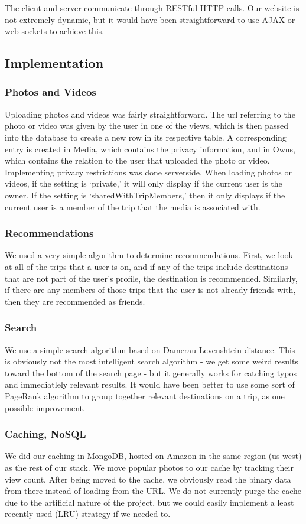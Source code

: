 \documentclass[11pt]{amsart}
\begin{document}
The client and server communicate through RESTful HTTP calls. Our website is not extremely dynamic,
but it would have been straightforward to use AJAX or web sockets to achieve this.

\subsection{Implementation}
\subsubsection{Photos and Videos}
Uploading photos and videos was fairly straightforward. The url referring to the photo or video was given by
the user in one of the views, which is then passed into the database to create a new row in its respective table.
A corresponding entry is created in Media, which contains the privacy information, and in Owns, which contains
the relation to the user that uploaded the photo or video.\\

Implementing privacy restrictions was done serverside. When loading photos or videos, if the setting is `private,'
it will only display if the current user is the owner. If the setting is `sharedWithTripMembers,' then it only displays
if the current user is a member of the trip that the media is associated with.
\subsubsection{Recommendations} We used a very simple algorithm to determine recommendations. First, we look at all of the
trips that a user is on, and if any of the trips include destinations that are not part of the user's profile, the destination
is recommended. Similarly, if there are any members of those trips that the user is not already friends with, then they are
recommended as friends.
\subsubsection{Search}
We use a simple search algorithm based on Damerau-Levenshtein distance. This is
obviously not the most intelligent search algorithm - we get some weird results
toward the bottom of the search page - but it generally works for catching typos
and immediatlely relevant results. It would have been better to use some sort of
PageRank algorithm to group together relevant destinations on a trip, as one
possible improvement.
\subsubsection{Caching, NoSQL}
We did our caching in MongoDB, hosted on Amazon in the same region (us-west) as
the rest of our stack. We move popular photos to our cache by tracking their
view count. After being moved to the cache, we obviously read the binary data
from there instead of loading from the URL. We do not currently purge the cache
due to the artificial nature of the project, but we could easily implement a
least recently used (LRU) strategy if we needed to.
\end{document}
